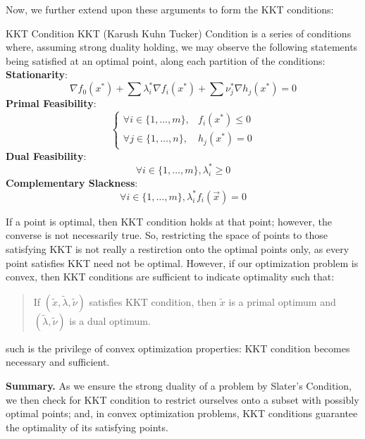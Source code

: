 Now, we further extend upon these arguments to form the KKT conditions:
\begin{ln-define}{KKT Condition}{}
    KKT (Karush Kuhn Tucker) Condition is a series of conditions where, assuming strong duality holding, we may observe the following statements being satisfied at an optimal point, along each partition of the conditions: \\
    \textbf{Stationarity}:
    \[
        \nabla f_0(x^*) + \sum \lambda_i^* \nabla {f_i(x^*)} + \sum \nu_j^* \nabla h_j (x^*) = 0
    \]
    \textbf{Primal Feasibility}:
    \[
        \begin{cases}
            \forall i \in \{1, \dots, m\}, &f_i(x^*) \leq 0 \\
            \forall j \in \{1, \dots, n\}, &h_j(x^*) = 0
        \end{cases}
    \]
    \textbf{Dual Feasibility}:
    \[
        \forall i \in \{1, \dots, m\}, \lambda_i^* \geq 0
    \]
    \textbf{Complementary Slackness}:
    \[
        \forall i \in \{1, \dots, m\}, \lambda_i^* f_i(\vec{x}) = 0
    \]
\end{ln-define}
If a point is optimal, then KKT condition holds at that point; however, the converse is not necessarily true.
So, restricting the space of points to those satisfying KKT is not really a restirction onto the optimal points only, as every point satisfies KKT need not be optimal.
However, if our optimization problem is convex, then KKT conditions are sufficient to indicate optimality such that:
\begin{quote}
    If $(\tilde{x}, \tilde{\lambda}, \tilde{\nu})$ satisfies KKT condition, then $\tilde{x}$ is a primal optimum and $(\tilde{\lambda}, \tilde{\nu})$ is a dual optimum.
\end{quote}
such is the privilege of convex optimization properties: KKT condition becomes necessary and sufficient.

\textbf{Summary.}
As we ensure the strong duality of a problem by Slater's Condition, we then check for KKT condition to restrict ourselves onto a subset with possibly optimal points; and, in convex optimization problems, KKT conditions guarantee the optimality of its satisfying points.


